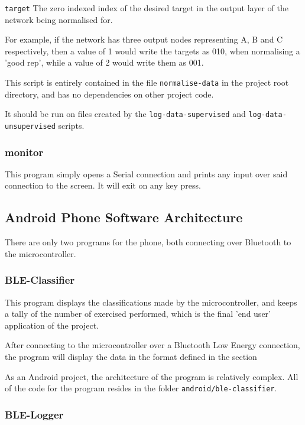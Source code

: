 \documentclass[a4paper]{article}
\begin{document}
\lstinline{target} The zero indexed index of the desired target in the output layer of the network being normalised for. 

For example, if the network has three output nodes representing A, B and C respectively, then a value of 1 would write the targets as 010, when normalising a 'good rep', while a value of 2 would write them as 001.

This script is entirely contained in the file \lstinline{normalise-data} in the project root directory, and has no dependencies on other project code.

It should be run on files created by the \lstinline{log-data-supervised} and \lstinline{log-data-unsupervised} scripts.

\subsubsection{monitor}

This program simply opens a Serial connection and prints any input over said connection to the screen. It will exit on any key press.

\subsection{Android Phone Software Architecture}%

There are only two programs for the phone, both connecting over Bluetooth to the microcontroller.

\subsubsection{BLE-Classifier}

This program displays the classifications made by the microcontroller, and keeps a tally of the number of exercised performed, which is the final 'end user' application of the project.

After connecting to the microcontroller over a Bluetooth Low Energy connection, the program will display the data in the format defined in the section 

As an Android project, the architecture of the program is relatively complex. All of the code for the program resides in the folder \lstinline{android/ble-classifier}. 


\subsubsection{BLE-Logger}
\end{document}
